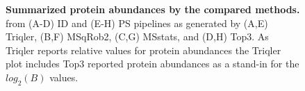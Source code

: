 \documentclass[11pt]{article}
\begin{document}
\begin{figure}[hbt]
\begin{tabular}{   >{\centering\arraybackslash} m{3cm} V V}
    \end{tabular}
    \caption{{\bf Summarized protein abundances by the compared methods.} from (A-D) ID and (E-H) PS pipelines as generated by 
    (A,E) Triqler, (B,F) MSqRob2, (C,G) MSstats, and (D,H) Top3.   As Triqler reports relative values for protein abundances the Triqler plot includes  Top3 reported protein abundances as a stand-in for the $log_2(B)$ values. \label{fig:fc_scatter_supplement}}
\end{figure}
\end{document}
